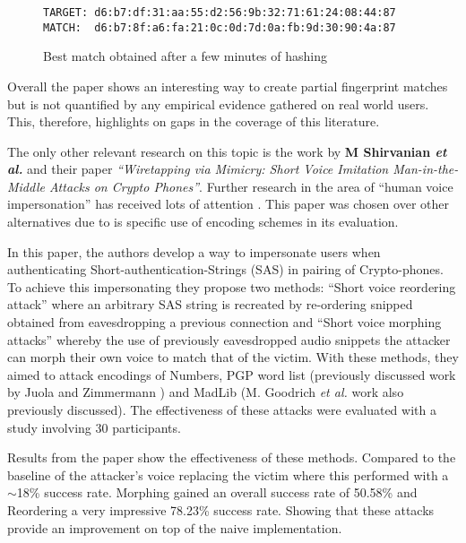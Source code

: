 \begin{figure}[!h]
    \begin{center}
        \verb|TARGET: d6:b7:df:31:aa:55:d2:56:9b:32:71:61:24:08:44:87|
        \verb|MATCH:  d6:b7:8f:a6:fa:21:0c:0d:7d:0a:fb:9d:30:90:4a:87|
    \end{center}
    \caption{Best match obtained after a few minutes of hashing}
    \label{ref:fuzz}
\end{figure}

Overall the paper shows an interesting way to create partial fingerprint matches but is not quantified by any empirical evidence gathered on real world users. This, therefore, highlights on gaps in the coverage of this literature.

The only other relevant research on this topic is the work by \textbf{M Shirvanian \textit{et al.}}\cite{shirvanian2014wiretapping} 
and their paper \textit{``Wiretapping via Mimicry: Short 
Voice Imitation Man-in-the-Middle Attacks on Crypto 
Phones''}. Further research in the area of ``human voice impersonation'' has received lots of attention \cite{mukhopadhyay2015all}\cite{chen2017you}\cite{wu2015spoofing}. This paper was chosen over other alternatives due to is specific use of encoding schemes in its evaluation.

In this paper, the authors develop a way to 
impersonate users when authenticating 
Short-authentication-Strings (SAS) in pairing of 
Crypto-phones. To achieve this impersonating they propose 
two methods: ``Short voice reordering attack'' where an 
arbitrary SAS string is recreated by re-ordering snipped 
obtained from eavesdropping a previous connection
and ``Short voice morphing attacks'' whereby the use of 
previously eavesdropped audio snippets the attacker can
morph their own voice to match that of the victim. With 
these methods, they aimed to attack encodings of Numbers, 
PGP word list (previously discussed work by Juola and 
Zimmermann \cite{juola1996whole}) and MadLib (M. Goodrich 
\textit{et al.}\cite{goodrich2006loud} work also 
previously discussed). The effectiveness of these attacks 
were evaluated with a study involving 30 participants.

Results from the paper show the effectiveness of these 
methods. Compared to the baseline of the attacker's voice 
replacing the victim where this performed with a 
$\sim$18\% success rate. Morphing gained an 
overall success rate of 50.58\% and Reordering a very 
impressive 78.23\% success rate. Showing that these 
attacks provide an improvement on top of the naive implementation.

